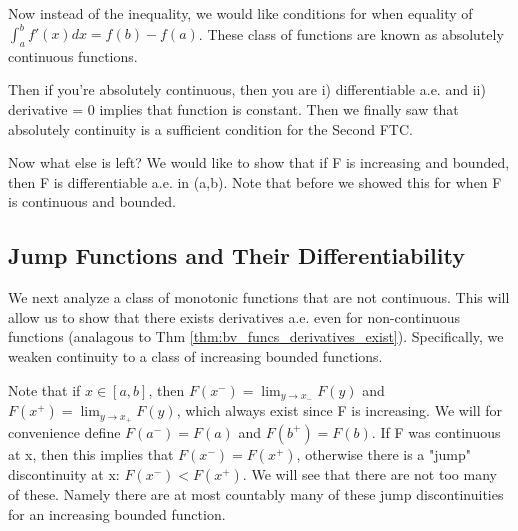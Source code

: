 \documentclass[class=article, crop=false]{standalone}
\begin{document}
		Now instead of the inequality, we would like conditions for when equality of $\int_a^b f'(x) dx = f(b) - f(a)$. These class of functions are known as absolutely continuous functions. 

		Then if you're absolutely continuous, then you are i) differentiable a.e. and ii) derivative = 0 implies that function is constant. Then we finally saw that absolutely continuity is a sufficient condition for the Second FTC.

		Now what else is left? We would like to show that if F is increasing and bounded, then F is differentiable a.e. in (a,b). Note that before we showed this for when F is continuous and bounded. 

	\subsection{Jump Functions and Their Differentiability}
		We next analyze a class of monotonic functions that are not continuous. This will allow us to show that there exists derivatives a.e. even for non-continuous functions (analagous to Thm \ref{thm:bv_funcs_derivatives_exist}). Specifically, we weaken continuity to a class of increasing bounded functions.

		Note that if $x \in [a,b]$, then $F(x^-) = \lim_{y \rightarrow x_-} F(y)$ and $F(x^+) = \lim_{y \rightarrow x_+} F(y)$, which always exist since F is increasing. We will for convenience define $F(a^-) = F(a)$ and $F(b^+) = F(b)$. If F was continuous at x, then this implies that $F(x^-) = F(x^+)$, otherwise there is a "jump" discontinuity at x: $F(x^-) < F(x^+)$. We will see that there are not too many of these. Namely there are at most countably many of these jump discontinuities for an increasing bounded function.
\end{document}
